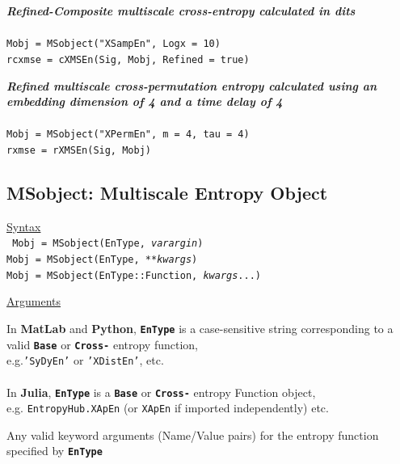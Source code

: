 \documentclass[12pt, a4paper, titlepage, openany]{book}
\begin{document}
\noindent \emph{\textbf{Refined-Composite multiscale cross-entropy calculated in dits}} \cite{cMS2}
\\ \ \\ \indent \texttt{Mobj = MSobject("XSampEn", Logx = 10)\\
\indent rcxmse = cXMSEn(Sig, Mobj, Refined = true)}

\noindent \emph{\textbf{Refined multiscale cross-permutation entropy calculated using an embedding dimension of 4 and a time delay of 4}}
\\ \ \\ \indent \texttt{Mobj = MSobject("XPermEn", m = 4, tau = 4)\\
\indent rxmse = rXMSEn(Sig, Mobj)}




\newpage
\subsection{\normalsize MSobject: \hspace{15mm} Multiscale Entropy Object}
\noindent\ul{Syntax} \vspace{6mm} \\ \noindent \texttt{\footnotesize
Mobj = MSobject(EnType, \textit{varargin})\\
Mobj = MSobject(EnType, \textit{**kwargs})\\ 
Mobj = MSobject(EnType::Function, \textit{kwargs}...)}

\noindent \ul{Arguments}
\begin{description}[labelsep=2cm, labelwidth=5cm, nosep, style=multiline,leftmargin=4cm]\footnotesize
\item[\texttt{EnType}]		In \textbf{MatLab} and \textbf{Python}, \texttt{\textbf{EnType}} is a case-sensitive 							string corresponding to a valid \texttt{\textbf{Base}} or  \texttt{\textbf{Cross-}} entropy 							function, \\	e.g.\texttt{'SyDyEn'} or \texttt{'XDistEn'}, etc.\\ \ \\
							In \textbf{Julia}, \texttt{\textbf{EnType}} is a \texttt{\textbf{Base}} or  									\texttt{\textbf{Cross-}} entropy Function object,\\ e.g. \texttt{EntropyHub.XApEn} (or 									\texttt{XApEn} if imported independently) etc.\\
\item[\texttt{varargin\\ **kwargs\\kwargs...}] 		Any valid keyword arguments (Name/Value pairs) for the entropy function specified by \texttt{\textbf{EnType}}\\
\end{description}
\end{document}
